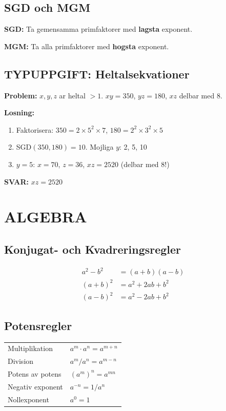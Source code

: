 \documentclass[11pt,a4paper]{article}
\begin{document}
\subsection{SGD och MGM}

\textbf{SGD:} Ta gemensamma primfaktorer med \textbf{lagsta} exponent.

\textbf{MGM:} Ta alla primfaktorer med \textbf{hogsta} exponent.


\subsection{TYPUPPGIFT: Heltalsekvationer}

\textbf{Problem:} $x, y, z$ ar heltal $> 1$. $xy = 350$, $yz = 180$, $xz$ delbar med 8.

\textbf{Losning:}
\begin{enumerate}
\item Faktorisera: $350 = 2 \times 5^2 \times 7$, $180 = 2^2 \times 3^2 \times 5$
\item SGD$(350, 180) = 10$. Mojliga $y$: 2, 5, 10
\item $y = 5$: $x = 70$, $z = 36$, $xz = 2520$ (delbar med 8!)
\end{enumerate}
\textbf{SVAR:} $xz = 2520$

\section{ALGEBRA}

\subsection{Konjugat- och Kvadreringsregler}

\begin{align}
a^2 - b^2 &= (a+b)(a-b)\\
(a+b)^2 &= a^2 + 2ab + b^2\\
(a-b)^2 &= a^2 - 2ab + b^2
\end{align}

\subsection{Potensregler}

\begin{tabular}{|l|l|}
\hline
Multiplikation & $a^m \cdot a^n = a^{m+n}$ \\
Division & $a^m / a^n = a^{m-n}$ \\
Potens av potens & $(a^m)^n = a^{mn}$ \\
Negativ exponent & $a^{-n} = 1/a^n$ \\
Nollexponent & $a^0 = 1$ \\
\hline
\end{tabular}
\end{document}
